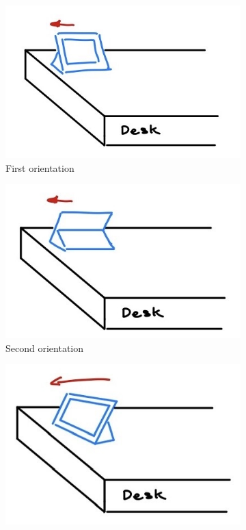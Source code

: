 \begin{enumerate}
  \begin{figure}[t!]
  \begin{subfigure}[t]{0.5\textwidth}
  \includegraphics[width = \textwidth]{test_images/drop_1.jpg}
  \caption{First orientation}
  \end{subfigure}
  \begin{subfigure}[t]{0.5\textwidth}
  \includegraphics[width = \textwidth]{test_images/drop_2.jpg}
  \caption{Second orientation}
  \end{subfigure}
  \begin{subfigure}[t]{0.5\textwidth}
  \includegraphics[width = \textwidth]{test_images/drop_3.jpg}

\end{subfigure}
\end{figure}
\end{enumerate}
